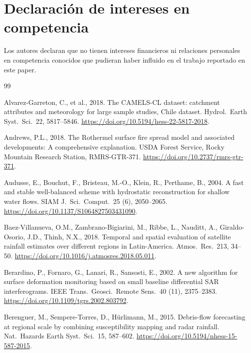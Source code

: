 \documentclass[authoryear,preprint,review,12pt]{elsarticle}
\begin{document}
\section*{Declaración de intereses en competencia}

Los autores declaran que no tienen intereses financieros ni relaciones personales en
competencia conocidos que pudieran haber influido en el trabajo reportado en este
paper.

\begin{thebibliography}{99}

Alvarez-Garreton, C., et al., 2018. The CAMELS-CL dataset: catchment attributes
and meteorology for large sample studies, Chile dataset. Hydrol.\ Earth Syst.\
Sci.\ 22, 5817--5846. \url{https://doi.org/10.5194/hess-22-5817-2018}.

Andrews, P.L., 2018. The Rothermel surface fire spread model and associated
developments: A comprehensive explanation. USDA Forest Service, Rocky Mountain
Research Station, RMRS-GTR-371. \url{https://doi.org/10.2737/rmrs-gtr-371}.

Audusse, E., Bouchut, F., Bristeau, M.-O., Klein, R., Perthame, B., 2004. A fast
and stable well-balanced scheme with hydrostatic reconstruction for shallow water
flows. SIAM J.\ Sci.\ Comput.\ 25 (6), 2050--2065.
\url{https://doi.org/10.1137/S1064827503431090}.

Baez-Villanueva, O.M., Zambrano-Bigiarini, M., Ribbe, L., Nauditt, A.,
Giraldo-Osorio, J.D., Thinh, N.X., 2018. Temporal and spatial evaluation of
satellite rainfall estimates over different regions in Latin-America. Atmos.\
Res.\ 213, 34--50. \url{https://doi.org/10.1016/j.atmosres.2018.05.011}.

\bibitem[Berardino et al.(2002)]{berardino2002}
Berardino, P., Fornaro, G., Lanari, R., Sansosti, E., 2002. A new algorithm for
surface deformation monitoring based on small baseline differential SAR
interferograms. IEEE Trans.\ Geosci.\ Remote Sens.\ 40 (11), 2375--2383.
\url{https://doi.org/10.1109/tgrs.2002.803792}.

Berenguer, M., Sempere-Torres, D., H\"urlimann, M., 2015. Debris-flow forecasting
at regional scale by combining susceptibility mapping and radar rainfall. Nat.\
Hazards Earth Syst.\ Sci.\ 15, 587--602.
\url{https://doi.org/10.5194/nhess-15-587-2015}.


\end{thebibliography}
\end{document}
